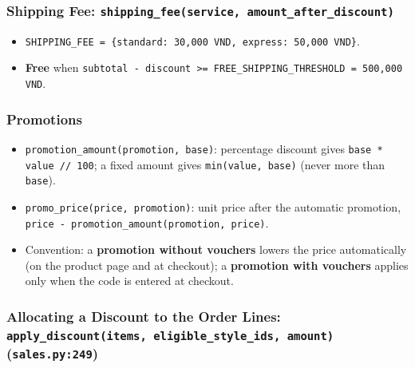 \hypertarget{shipping-fee-shipping_feeservice-amount_after_discount}{%
\subsubsection{\texorpdfstring{Shipping Fee:
\texttt{shipping\_\allowbreak{}fee(\allowbreak{}service,\allowbreak{} amount\_\allowbreak{}after\_\allowbreak{}discount)}}{Shipping Fee: shipping\_fee(service, amount\_after\_discount)}}\label{shipping-fee-shipping_feeservice-amount_after_discount}}

\begin{itemize}
\tightlist
\item
  \texttt{SHIPPING\_\allowbreak{}FEE =\allowbreak{} \{standard: 30,\allowbreak{}000 VND,\allowbreak{} express: 50,\allowbreak{}000 VND\}}.
\item
  \textbf{Free} when
  \texttt{subtotal - discount \textgreater{}\allowbreak{}=\allowbreak{} FREE\_\allowbreak{}SHIPPING\_\allowbreak{}THRESHOLD =\allowbreak{} 500,\allowbreak{}000 VND}.
\end{itemize}

\hypertarget{promotions}{%
\subsubsection{Promotions}\label{promotions}}

\begin{itemize}
\tightlist
\item
  \texttt{promotion\_\allowbreak{}amount(\allowbreak{}promotion,\allowbreak{} base)}: percentage discount
  gives \texttt{base * value /\allowbreak{}/\allowbreak{} 100}; a fixed amount gives
  \texttt{min(\allowbreak{}value,\allowbreak{} base)} (never more than \texttt{base}).
\item
  \texttt{promo\_\allowbreak{}price(\allowbreak{}price,\allowbreak{} promotion)}: unit price after the
  automatic promotion,
  \texttt{price - promotion\_\allowbreak{}amount(\allowbreak{}promotion,\allowbreak{} price)}.
\item
  Convention: a \textbf{promotion without vouchers} lowers the price
  automatically (on the product page and at checkout); a
  \textbf{promotion with vouchers} applies only when the code is entered
  at checkout.
\end{itemize}

\hypertarget{allocating-a-discount-to-the-order-lines-apply_discountitems-eligible_style_ids-amount-sales.py249}{%
\subsubsection{\texorpdfstring{Allocating a Discount to the Order Lines:
\texttt{apply\_\allowbreak{}discount(\allowbreak{}items,\allowbreak{} eligible\_\allowbreak{}style\_\allowbreak{}ids,\allowbreak{} amount)}
(\texttt{sales.\allowbreak{}py:249})}{Allocating a Discount to the Order Lines: apply\_discount(items, eligible\_style\_ids, amount) (sales.py:249)}}\label{allocating-a-discount-to-the-order-lines-apply_discountitems-eligible_style_ids-amount-sales.py249}}

